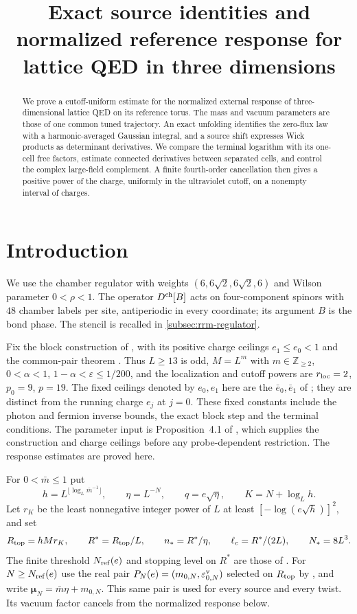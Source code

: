 \documentclass[11pt,letterpaper,reqno]{amsart}
\title[Source identities and reference response]{Exact source identities and normalized reference response for lattice QED in three dimensions}
\date{}
\newcommand{\Z}{\mathbb Z}
\begin{document}
\begin{abstract}
We prove a cutoff-uniform estimate for the normalized external response
of three-dimensional lattice QED on its reference torus. The mass and
vacuum parameters are those of one common tuned trajectory. An exact
unfolding identifies the zero-flux law with a harmonic-averaged Gaussian
integral, and a source shift expresses Wick products as determinant
derivatives. We compare the terminal logarithm with its one-cell free
factors, estimate connected derivatives between separated cells, and
control the complex large-field complement. A finite fourth-order
cancellation then gives a positive power of the charge, uniformly in
the ultraviolet cutoff, on a nonempty interval of charges.
\end{abstract}
\maketitle
\tableofcontents
\section{Introduction}\label{sec:rrm-introduction}

We use the chamber regulator with weights $(6,6\sqrt2,6\sqrt2,6)$
and Wilson parameter $0<\rho<1$. The operator $D^{\rm ch}[B]$
acts on four-component spinors with $48$ chamber labels per site,
antiperiodic in every coordinate; its argument $B$ is the bond phase.
The stencil is recalled in \cref{subsec:rrm-regulator}.

Fix the block construction of \cite[Proposition~4.1 and \S4.1--4.4]{QED3Integration},
with its positive charge ceilings $e_1\le e_0<1$ and the
common-pair theorem \cite[Theorem~D]{CoverTuning}.
Thus $L\ge13$ is odd, $M=L^m$ with $m\in\Z_{\ge2}$,
$0<\alpha<1$, $1-\alpha<\varepsilon\le1/200$, and the localization and cutoff
powers are $r_{\rm loc}=2$, $p_0=9$, $p=19$.
The fixed ceilings denoted by $e_0,e_1$ here are the
$\bar e_0,\bar e_1$ of \cite{QED3Integration};
they are distinct from the running charge $e_j$ at $j=0$.
These fixed constants include the photon and fermion inverse bounds,
the exact block step and the terminal conditions. The parameter input is Proposition~4.1 of \cite{QED3Integration},
which supplies the construction and charge ceilings before any
probe-dependent restriction. The response estimates are proved here.

For $0<\bar m\le1$ put
\[
 h=L^{\lfloor\log_L\bar m^{-1}\rfloor},\qquad
 \eta=L^{-N},\qquad q=e\sqrt\eta,\qquad K=N+\log_Lh.
\]
Let $r_K$ be the least nonnegative integer power of $L$ at least
$[-\log(e\sqrt h)]^2$, and set
\[
 R_{\rm top}=hMr_K,\qquad R^*=R_{\rm top}/L,\qquad
 n_*=R^*/\eta,\qquad \ell_c=R^*/(2L),\qquad N_*=8L^3.
\]
The finite threshold $N_{\rm ref}(e)$ and stopping level on $R^*$
are those of \cite[Proposition~6.1 and (53)]{CoverTuning}.
For $N\ge N_{\rm ref}(e)$ use the real pair
$P_N(e)=(m_{0,N},\varepsilon_{0,N}^{\rm v})$ selected on
$R_{\rm top}$ by \cite[Theorem~D]{CoverTuning}, and write
$\boldsymbol\mu_N=\bar m\eta+m_{0,N}$.
This same pair is used for every source and every twist.
Its vacuum factor cancels from the normalized response below.
\end{document}
